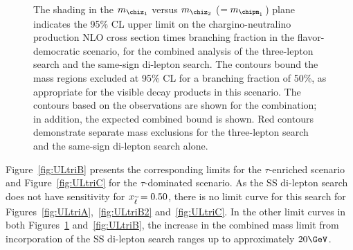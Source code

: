 \begin{figure}[!p]
\begin{center}
\caption{
The shading in the $m_{\chiz_1}$ versus $m_{\chiz_2}$
($=m_{\chipm_1}$) plane indicates the 95\% CL upper limit on the
chargino-neutralino production NLO cross section times branching fraction
in the flavor-democratic scenario, for the combined analysis of the
three-lepton search and the same-sign di-lepton search.  
The contours bound the mass regions excluded at 95\%
CL for a branching fraction of 50\%, as appropriate for the visible
decay products in this scenario. The contours based on the
observations are shown for the combination; in addition, the expected 
combined bound is shown. Red contours demonstrate separate mass exclusions 
for the three-lepton search and the same-sign di-lepton search alone.
}
\label{fig:ULtriAss}
\end{center}
\end{figure}

Figure~\ref{fig:ULtriB} presents the corresponding limits for the $\tau$-enriched scenario 
and Figure~\ref{fig:ULtriC} for the $\tau$-dominated scenario.  
As the SS di-lepton search does not have sensitivity for $x_{\widetilde{\ell}}=0.50$, there is no limit curve for this search
for Figures~\ref{fig:ULtriA},~\ref{fig:ULtriB2} and~\ref{fig:ULtriC}.  In the other limit curves in both
Figures~\ref{fig:ULtriAss} and~\ref{fig:ULtriB}, the increase in the
combined mass limit from incorporation of the SS di-lepton search
ranges up to approximately $20\GeV$.


